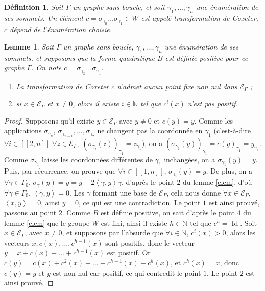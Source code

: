 \documentclass[a4paper,11pt]{article}
\newtheorem{lm}[thm]{Lemme}%
\newtheorem{defi}[thm]{Définition}%
\DeclareMathOperator{\Id}{Id}
\newcommand{\ps}[2]{\left\langle#1,#2\right\rangle}
\newcommand{\EG}{\mathscr{E}_\Gamma}
\newcommand{\ent}[2]{[\![#1,#2]\!]}
\begin{document}
\begin{defi}
	Soit $\Gamma$ un graphe sans boucle, et soit $\gamma_1,\dots,\gamma_n$ une énumération de ses sommets. Un élément $c=\sigma_{\gamma_n}\dots\sigma_{\gamma_1}\in W$ est appelé \emph{transformation de Coxeter}, $c$ dépend de l'énumération choisie.
\end{defi}
\begin{lm}
Soit $\Gamma$ un graphe sans boucle, $\gamma_1,\dots,\gamma_n$ une énumération de ses sommets, et supposons que la forme quadratique $B$ est définie positive pour ce graphe $\Gamma$. On note $c=\sigma_{\gamma_n}\dots\sigma_{\gamma_1}$.
\begin{enumerate}
	\item La transformation de Coxeter $c$ n'admet aucun point fixe non nul dans $\EG$ ;
	\item si $x\in\EG$ et $x\neq0$, alors il existe $i\in\mathbb N$ tel que $c^i(x)$ n'est pas positif.
\end{enumerate}
\end{lm}
\begin{proof}
	Supposons qu'il existe $y\in\EG$ avec $y\neq0$ et $c(y)=y$. Comme les applications $\sigma_{\gamma_n}$, $\sigma_{\gamma_{n-1}},\dots,\sigma_{\gamma_2}$ ne changent pas la coordonnée en $\gamma_1$ (c'est-à-dire $\forall i\in\ent{2}{n}\;\forall z\in\EG,\;(\sigma_{\gamma_i}(z))_{\gamma_1}=z_{\gamma_1}$), on a $(\sigma_{\gamma_1}(y))_{\gamma_1}=c(y)_{\gamma_1}=y_{\gamma_1}$. Comme $\sigma_{\gamma_1}$ laisse les coordonnées différentes de $\gamma_1$ inchangées, on a $\sigma_{\gamma_1}(y)=y$. Puis, par récurrence, on prouve que $\forall i\in\ent{1}{n}$, $\sigma_{\gamma_i}(y)=y$. De plus, on a $\forall\gamma\in\Gamma_0$, $\sigma_{\gamma}(y)=y=y-2\ps{\bar\gamma}{y}\bar\gamma$, d'après le point $2$ du lemme \ref{elem}, d'où $\forall\gamma\in\Gamma_0$, $\ps{\bar\gamma}{y}=0$. Les $\bar\gamma$ formant une base de $\EG$, cela nous donne $\forall x\in\EG$, $\ps{x}{y}=0$, ainsi $y=0$, ce qui est une contradiction. Le point $1$ est ainsi prouvé, passons au point $2$. Comme $B$ est définie positive, on sait d'après le point $4$ du lemme \ref{elem} que le groupe $W$ est fini, ainsi il existe $h\in\mathbb N$ tel que $c^h=\Id$. Soit $x\in\EG$, avec $x\neq0$, et supposons par l'absurde que $\forall i\in\mathbb N$, $c^i(x)>0$, alors les vecteurs $x,c(x),\dots,c^{h-1}(x)$ sont positifs, donc le vecteur $y=x+c(x)+\dots+c^{h-1}(x)$ est positif. Or $c(y)=c(x)+c^2(x)+\dots+c^{h-1}(x)+c^h(x)$, et $c^h(x)=x$, donc $c(y)=y$ et $y$ est non nul car positif, ce qui contredit le point $1$. Le point $2$ est ainsi prouvé.
\end{proof}
\clearpage
\end{document}
